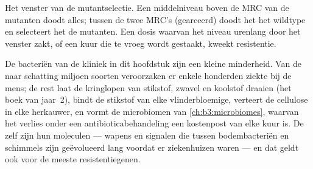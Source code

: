 \begin{omfigure}

{\small Het venster van de mutantselectie. Een middelniveau boven de
MRC van de mutanten doodt alles; tussen de twee MRC's (gearceerd) doodt
het het wildtype en selecteert het de mutanten. Een dosis waarvan het
niveau urenlang door het venster zakt, of een kuur die te vroeg wordt
gestaakt, kweekt resistentie.}
\end{omfigure}

\begin{remark}\label{rem:b3:bacteriology:most}
De bacteriën van de kliniek in dit hoofdstuk zijn een kleine
minderheid. Van de naar schatting miljoen soorten veroorzaken er enkele
honderden ziekte bij de mens; de rest laat de kringlopen van stikstof,
zwavel en koolstof draaien (het boek van jaar~2), bindt de stikstof van
elke vlinderbloemige, verteert de cellulose in elke herkauwer, en vormt
de microbiomen van \cref{ch:b3:microbiomes}, waarvan het verlies onder
een antibioticabehandeling een kostenpost van elke kuur is. De
 zelf zijn hun moleculen --- wapens en signalen die tussen
bodembacteriën en schimmels zijn geëvolueerd lang voordat er
ziekenhuizen waren --- en dat geldt ook voor de meeste
resistentiegenen.
\end{remark}

